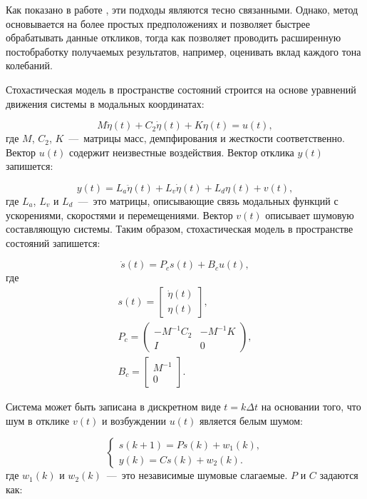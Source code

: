 Как показано в работе \cite{lib:oma:Peeters}, эти подходы являются тесно связанными. Однако, метод  основывается на более простых предположениях и позволяет быстрее обрабатывать данные откликов, тогда как  позволяет проводить расширенную постобработку получаемых результатов, например, оценивать вклад каждого тона колебаний.

Стохастическая модель в пространстве состояний строится на основе уравнений движения системы в модальных координатах:

\begin{equation}
	M \ddot{\eta}(t) + C_2 \dot{\eta}(t) + K \eta(t) = u(t),
\end{equation}
где $ M $, $ C_2 $, $ K $~---~матрицы масс, демпфирования и жесткости соответственно. Вектор $ u(t) $ содержит неизвестные воздействия. Вектор отклика $ y(t) $ запишется:

\begin{equation}
	y(t) = L_a \ddot{\eta}(t) + L_v \dot{\eta}(t) + L_d \eta(t) + v(t),
\end{equation}
где $ L_a $, $ L_v $ и $ L_d $~---~это матрицы, описывающие связь модальных функций с ускорениями, скоростями и перемещениями. Вектор $ v(t) $ описывает шумовую составляющую системы. Таким образом, стохастическая модель в пространстве состояний запишется:

\begin{equation}
	\dot{s}(t) = P_c s(t) + B_c u(t), \label{eq:stochasticModelSSI}
\end{equation}
где 
\begin{gather}
	s(t) = \begin{bmatrix} \dot{\eta}(t) \\ \eta(t) \end{bmatrix}, \\
	P_c =
	\begin{pmatrix}
		-M^{-1} C_2 & -M^{-1} K \\ I & 0
	\end{pmatrix}, \\
	B_c = 
	\begin{bmatrix}
		M^{-1} \\
		0	
	\end{bmatrix}.
\end{gather}

Система может быть записана в дискретном виде $ t = k \Delta t $ на основании того, что шум в отклике $ v(t) $ и возбуждении $ u(t) $ является белым шумом:

\begin{equation}
	\begin{cases}
		s(k + 1) = P s(k) + w_1(k), \\
		y(k) = C s(k) + w_2(k).
	\end{cases}
\end{equation}
где $w_1(k)$ и $w_2(k)$~---~это независимые шумовые слагаемые. $ P $ и $ C $ задаются как:

